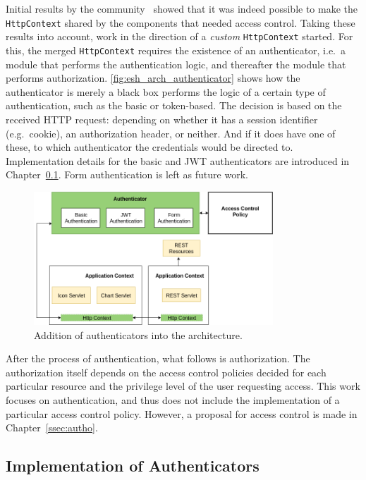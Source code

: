 \documentclass[12pt]{article}
\begin{document}
Initial results by the community~\cite{esh_03} showed that it was indeed possible to make the \texttt{HttpContext} shared by the components that needed access control. Taking these results into account, work in the direction of a \emph{custom} \texttt{HttpContext} started. For this, the merged \texttt{HttpContext} requires the existence of an authenticator, i.e.\ a module that performs the authentication logic, and thereafter the module that performs authorization. \autoref{fig:esh_arch_authenticator} shows how the authenticator is merely a black box performs the logic of a certain type of authentication, such as the basic or token-based. The decision is based on the received HTTP request: depending on whether it has a session identifier (e.g.\ cookie), an authorization header, or neither. And if it does have one of these, to which authenticator the credentials would be directed to. Implementation details for the basic and JWT authenticators are introduced in Chapter~\ref{ssec:impl}. Form authentication is left as future work. 

\begin{figure} [ht] 
\begin{center}
\includegraphics[width=0.8\textwidth]{esh_arch_authenticator}
\caption{Addition of authenticators into the architecture.}
\label{fig:esh_arch_authenticator}
\end{center}
\end{figure}

After the process of authentication, what follows is authorization. The authorization itself depends on the access control policies decided for each particular resource and the privilege level of the user requesting access. This work focuses on authentication, and thus does not include the implementation of a particular access control policy. However, a proposal for access control is made in Chapter~\ref{ssec:autho}.

\subsection{Implementation of Authenticators}
\label{ssec:impl}
\end{document}
